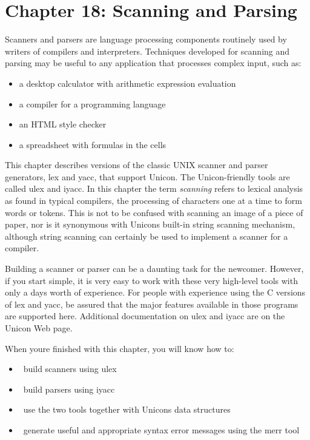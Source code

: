 \clearpage\section{Chapter 18: Scanning and Parsing}

Scanners and parsers are language processing components routinely used
by writers of compilers and interpreters. Techniques developed for
scanning and parsing may be useful to any application that processes
complex input, such as:

\begin{itemize}
\item a desktop calculator with arithmetic expression evaluation
\item a compiler for a programming language
\item an HTML style checker
\item a spreadsheet with formulas in the cells
\end{itemize}

This chapter describes versions of the classic UNIX scanner and parser
generators, \textsf{lex} and \textsf{yacc}, that
support Unicon. The Unicon-friendly tools are called \textsf{ulex} and
\textsf{iyacc}. In this chapter the term {\em scanning\/} refers to lexical
analysis as found in typical compilers, the processing of characters
one at a time to form words or tokens. This is not to be confused with
scanning an image of a piece of paper, nor is it synonymous with
Unicon{\textquotesingle}s built-in string scanning mechanism, although
string scanning can certainly be used to implement a scanner for a
compiler.

Building a scanner or parser can be a daunting task for
the newcomer. However, if you start simple, it is very easy to work
with these very high-level tools with only a day{\textquotesingle}s
worth of experience. For people with experience using the C versions of
\textsf{lex} and \textsf{yacc}, be assured that the major features
available in those programs are supported here. Additional
documentation on \textsf{ulex} and \textsf{iyacc} are on the Unicon Web
page.

When you{\textquotesingle}re finished with this chapter, you will know
how to:

\begin{itemize}
\item \ build scanners using \textsf{ulex}
\item \ build parsers using \textsf{iyacc}
\item \ use the two tools together with Unicon{\textquotesingle}s data
structures
\item \ generate useful and appropriate syntax error messages using the
\textsf{merr} tool
\end{itemize}

